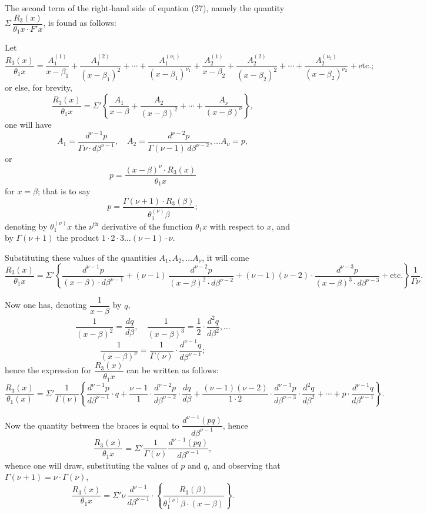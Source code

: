\documentclass{article}
\begin{document}
The second term of the right-hand side of equation (27), namely the quantity $\Sigma\,\dfrac{R_3(x)}{\theta_1 x \cdot F' x}$, is found as follows:

Let
\[ \frac{R_3(x)}{\theta_1 x} = \frac{A_1^{(1)}}{x-\beta_1} + \frac{A_1^{(2)}}{(x-\beta_1)^{2}} + \cdots + \frac{A_1^{(\nu_1)}}{(x-\beta_1)^{\nu_1}} + \frac{A_2^{(1)}}{x-\beta_2} + \frac{A_2^{(2)}}{(x-\beta_2)^{2}} + \cdots + \frac{A_2^{(\nu_2)}}{(x-\beta_2)^{\nu_2}} + \text{etc.;} \]
or else, for brevity,
\[ \frac{R_3(x)}{\theta_1 x} = \Sigma' \left\{ \frac{A_1}{x-\beta} + \frac{A_2}{(x-\beta)^{2}} + \cdots + \frac{A_\nu}{(x-\beta)^{\nu}} \right\}, \]
one will have
\[ A_1 = \frac{d^{\nu-1} p}{\Gamma\nu \cdot d\beta^{\nu-1}}, \quad A_2 = \frac{d^{\nu-2} p}{\Gamma(\nu-1)\,d\beta^{\nu-2}}, \ldots A_\nu = p, \]
or
\[ p = \frac{(x-\beta)^{\nu} \cdot R_3(x)}{\theta_1 x} \]
for $x = \beta$; that is to say
\[ p = \frac{\Gamma(\nu+1) \cdot R_3(\beta)}{\theta_1^{(\nu)}\beta}; \]
denoting by $\theta_1^{(\nu)} x$ the $\nu^{\text{th}}$ derivative of the function $\theta_1 x$ with respect to $x$, and by $\Gamma(\nu+1)$ the product $1 \cdot 2 \cdot 3 \ldots (\nu-1) \cdot \nu$.

Substituting these values of the quantities $A_1, A_2, \ldots A_\nu$, it will come
\[ \frac{R_3(x)}{\theta_1 x} = \Sigma' \left\{ \frac{d^{\nu-1} p}{(x-\beta) \cdot d\beta^{\nu-1}} + (\nu-1)\,\frac{d^{\nu-2} p}{(x-\beta)^{2} \cdot d\beta^{\nu-2}} + (\nu-1)(\nu-2) \cdot \frac{d^{\nu-3} p}{(x-\beta)^{3} \cdot d\beta^{\nu-3}} + \text{etc.} \right\} \frac{1}{\Gamma\nu}. \]

Now one has, denoting $\dfrac{1}{x-\beta}$ by $q$,
\[ \frac{1}{(x-\beta)^{2}} = \frac{dq}{d\beta}, \quad \frac{1}{(x-\beta)^{3}} = \frac{1}{2} \cdot \frac{d^{2} q}{d\beta^{2}}, \ldots \]
\[ \frac{1}{(x-\beta)^{\nu}} = \frac{1}{\Gamma(\nu)} \cdot \frac{d^{\nu-1} q}{d\beta^{\nu-1}}; \]
hence the expression for $\dfrac{R_3(x)}{\theta_1 x}$ can be written as follows:
\[ \frac{R_3(x)}{\theta_1(x)} = \Sigma' \frac{1}{\Gamma(\nu)} \left\{ \frac{d^{\nu-1} p}{d\beta^{\nu-1}} \cdot q + \frac{\nu-1}{1} \cdot \frac{d^{\nu-2} p}{d\beta^{\nu-2}} \cdot \frac{dq}{d\beta} + \frac{(\nu-1)(\nu-2)}{1 \cdot 2} \cdot \frac{d^{\nu-3} p}{d\beta^{\nu-3}} \cdot \frac{d^{2} q}{d\beta^{2}} + \cdots + p \cdot \frac{d^{\nu-1} q}{d\beta^{\nu-1}} \right\}. \]

Now the quantity between the braces is equal to $\dfrac{d^{\nu-1}(pq)}{d\beta^{\nu-1}}$, hence
\[ \frac{R_3(x)}{\theta_1 x} = \Sigma' \frac{1}{\Gamma(\nu)} \frac{d^{\nu-1}(pq)}{d\beta^{\nu-1}}, \]
whence one will draw, substituting the values of $p$ and $q$, and observing that $\Gamma(\nu+1) = \nu \cdot \Gamma(\nu)$,
\[ \frac{R_3(x)}{\theta_1 x} = \Sigma' \nu\,\frac{d^{\nu-1}}{d\beta^{\nu-1}} \cdot \left\{ \frac{R_3(\beta)}{\theta_1^{(\nu)}\beta \cdot (x-\beta)} \right\}. \]
\end{document}
